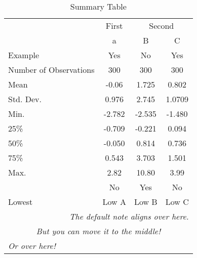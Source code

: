 \begin{table}[!ht]
  \centering
  \caption{Summary Table}
  \label{table:summarytable}
\begin{tabular}{lccc}
  \toprule
  \toprule
  & \multicolumn{1}{c}{First} & \multicolumn{2}{c}{Second} \\
  \cmidrule(lr){2-2}\cmidrule(lr){3-4}
   &   a & B & C\\
  Example & Yes & No & Yes\\
  \midrule
  Number of Observations & 300 & 300 & 300 \\
  Mean & -0.06 & 1.725 & 0.802 \\
  Std. Dev. & 0.976 & 2.745 & 1.0709 \\
  Min. & -2.782 & -2.535 & -1.480 \\
  25\% & -0.709 & -0.221 & 0.094 \\
  50\% & -0.050 & 0.814 & 0.736 \\
  75\% & 0.543 & 3.703 & 1.501 \\
  Max. & 2.82 & 10.80 & 3.99 \\
   & No & Yes & No\\
  \bottomrule
  Lowest & Low A & Low B & Low C\\
  \bottomrule
  \multicolumn{4}{r}{{\small \textit{The default note aligns over here.}}}\\
  \multicolumn{4}{c}{{\small \textit{But you can move it to the middle!}}}\\
  \multicolumn{4}{l}{{\small \textit{Or over here!}}}\\
\end{tabular}
\end{table}
